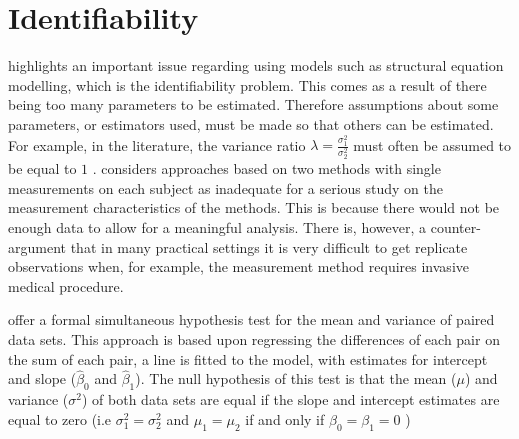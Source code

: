 \documentclass[12pt, a4paper]{report}
\theoremstyle{plain}
\theoremstyle{definition}
\theoremstyle{remark}
\begin{document}
	\section{Identifiability}
	\citet{DunnSEME} highlights an important issue regarding using models such as structural equation modelling, which is the identifiability problem. This comes as a
	result of there being too many parameters to be estimated. Therefore assumptions about some parameters, or estimators used, must be made so that others can be estimated. For example, in the literature, the variance ratio $\lambda=\frac{\sigma^{2}_{1}}{\sigma^{2}_{2}}$
	must often be assumed to be equal to $1$ \citep{linnet98}. \citet{DunnSEME} considers approaches based on two methods with single measurements on each subject as inadequate for a serious
	study on the measurement characteristics of the methods. This is because there would not be enough data to allow for a meaningful
	analysis. There is, however, a counter-argument that in many practical settings it is very difficult to get replicate observations when, for example, the measurement method requires invasive medical
	procedure.
	
	\citet{BB89} offer a formal simultaneous hypothesis test for the mean and variance of paired data sets. This approach is based upon regressing the differences of each pair on the sum of each pair, a
	line is fitted to the model, with estimates for intercept and
	slope ($\hat{\beta}_{0}$ and $\hat{\beta}_{1}$). The null
	hypothesis of this test is that the mean ($\mu$) and variance
	($\sigma^{2}$) of both data sets are equal if the slope and
	intercept estimates are equal to zero (i.e $\sigma^{2}_{1} =
	\sigma^{2}_{2}$ and $\mu_{1}=\mu_{2}$ if and only if $\beta_{0}=
	\beta_{1}=0$ )
	
\end{document}
